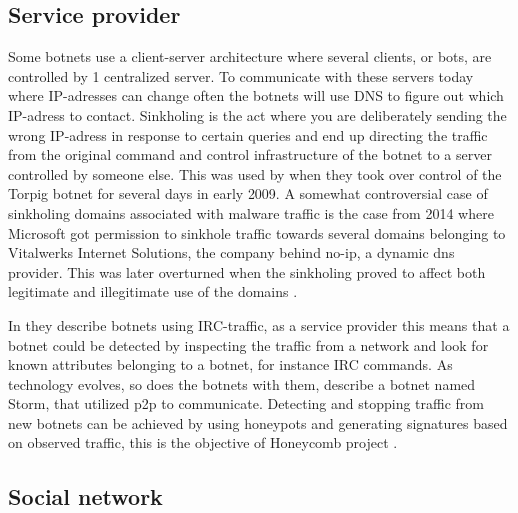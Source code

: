 \subsection{Service provider}
Some botnets use a client-server architecture where several clients, or bots, are controlled by 1 centralized server. To communicate with these servers today where IP-adresses can change often the botnets will use DNS to figure out which IP-adress to contact. Sinkholing is the act where you are deliberately sending the wrong IP-adress in response to certain queries and end up directing the traffic from the original command and control infrastructure of the botnet to a server controlled by someone else.
This was used by \cite{jan_stone-gross} when they took over control of the Torpig botnet for several days in early 2009. A somewhat controversial case of sinkholing domains associated with malware traffic is the case from 2014 where Microsoft got permission to sinkhole traffic towards several domains belonging to Vitalwerks Internet Solutions, the company behind no-ip, a dynamic dns provider. This was later overturned when the sinkholing proved to affect both legitimate and illegitimate use of the domains \cite{jan-microsoft-no-ip}.

In \cite{jan-usenix-botnet} they describe botnets using IRC-traffic, as a service provider this means that a botnet could be detected by inspecting the traffic from a network and look for known attributes belonging to a botnet, for instance IRC commands. As technology evolves, so does the botnets with them, \cite{jan_stone-gross} describe a botnet named Storm, that  utilized p2p to communicate. Detecting and stopping traffic from new botnets can be achieved by using honeypots and generating signatures based on observed traffic, this is the objective of Honeycomb project \cite{jan-Kreibich}.


\subsection{Social network}

